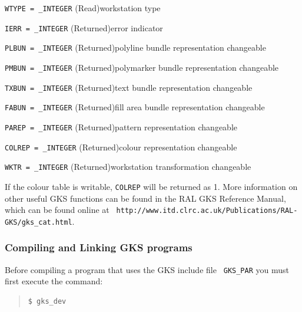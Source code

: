 \documentclass[twoside,11pt]{article}
\newcommand{\htmladdnormallink}[2]{#1}
\newcommand{\latex}[1]{#1}
\begin{document}
\begin{description}
\item {\tt WTYPE = \_INTEGER} (Read)\newline workstation type
\item {\tt IERR = \_INTEGER} (Returned)\newline error indicator
\item {\tt PLBUN = \_INTEGER} (Returned)\newline polyline bundle representation changeable
\item {\tt PMBUN = \_INTEGER} (Returned)\newline polymarker bundle representation changeable
\item {\tt TXBUN = \_INTEGER} (Returned)\newline text bundle representation changeable
\item {\tt FABUN = \_INTEGER} (Returned)\newline fill area bundle representation changeable
\item {\tt PAREP = \_INTEGER} (Returned)\newline pattern representation changeable
\item {\tt COLREP = \_INTEGER} (Returned)\newline colour representation changeable
\item {\tt WKTR = \_INTEGER} (Returned)\newline workstation transformation changeable
\end{description}

If the colour table is writable, {\tt COLREP} will be returned as 1.
More information on other useful GKS functions can be found in the
\htmladdnormallink{RAL GKS Reference
Manual}{http://www.itd.clrc.ac.uk/Publications/RAL-GKS/gks_cat.html}\latex{,
which can be found online at {\tt
http://www.itd.clrc.ac.uk/Publications/RAL-GKS/gks\_cat.html}}.

\subsubsection{Compiling and Linking GKS programs}

Before compiling a program that uses the GKS include file {\tt
GKS\_PAR} you must first execute the command:

\small
\begin{quote}
\begin{verbatim}
$ gks_dev
\end{verbatim}
\end{quote}
\normalsize
\end{document}
